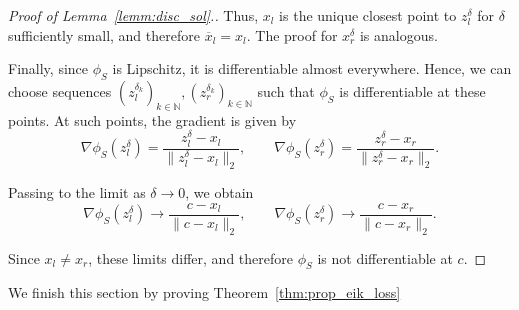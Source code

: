\documentclass[pdflatex]{sn-jnl}%
\begin{document}
\begin{proof}[Proof of Lemma~\ref{lemm:disc_sol}.]
Thus, $x_l$ is the unique closest point to $z_l^\delta$ for $\delta$ sufficiently small, and therefore $\overline{x}_l=x_l$. The proof for $x_r^\delta$ is analogous.

Finally, since $\phi_S$ is Lipschitz, it is differentiable almost everywhere. Hence, we can choose sequences $(z_l^{\delta_k} )_{k\in \mathbb{N}},(z_r^{\delta_k} )_{k\in \mathbb{N}}$ such that $\phi_S$ is differentiable at these points. At such points, the gradient is given by
\[
\nabla \phi_S(z_l^\delta) = \frac{z_l^\delta - x_l}{\|z_l^\delta - x_l\|_2}, 
\qquad
\nabla \phi_S(z_r^\delta) = \frac{z_r^\delta - x_r}{\|z_r^\delta - x_r\|_2}.
\]

Passing to the limit as $\delta \to 0$, we obtain
\[
\nabla \phi_S(z_l^\delta) \to \frac{c - x_l}{\|c - x_l\|_2}, 
\qquad
\nabla \phi_S(z_r^\delta) \to \frac{c - x_r}{\|c - x_r\|_2}.
\]

Since $x_l \neq x_r$, these limits differ, and therefore $\phi_S$ is not differentiable at $c$.
\end{proof}
We finish this section by proving Theorem~\ref{thm:prop_eik_loss}
\end{document}
